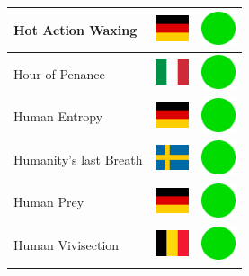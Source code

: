 \documentclass[12pt, a4paper, twoside]{report}
\begin{document}
\begin{center}
\begin{longtable}{|p{5cm}|p{2cm}|p{2cm}|}
 Hot Action Waxing                                          & \includegraphics[width=1cm]{../img/flags/de} &   \includegraphics[width=1cm]{../likes/y} \\ \hline
 Hour of Penance                                            & \includegraphics[width=1cm]{../img/flags/it} &   \includegraphics[width=1cm]{../likes/y} \\ \hline
 Human Entropy                                              & \includegraphics[width=1cm]{../img/flags/de} &   \includegraphics[width=1cm]{../likes/y} \\ \hline
 Humanity's last Breath                                     & \includegraphics[width=1cm]{../img/flags/se} &   \includegraphics[width=1cm]{../likes/y} \\ \hline
 Human Prey                                                 & \includegraphics[width=1cm]{../img/flags/de} &   \includegraphics[width=1cm]{../likes/y} \\ \hline
 Human Vivisection                                          & \includegraphics[width=1cm]{../img/flags/be} &   \includegraphics[width=1cm]{../likes/y} \\ \hline

\end{longtable}
\end{center}
\end{document}
